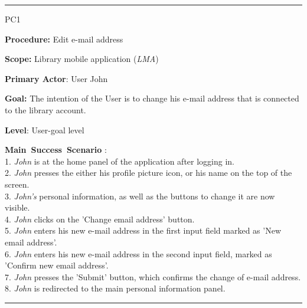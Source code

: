 \vspace{0.5cm}
\hrule
\begin{lyxlist}{PC1}
\small{
\item [\textbf{Procedure:}] Edit e-mail address
\item [\textbf{Scope:}] Library mobile application (\emph{LMA})
\item [\textbf{Primary Actor}:] User John
\item [\textbf{Goal:}] The intention of the User is to change his e-mail address
that is connected to the library account.
\item [\textbf{Level}:] User-goal level
\item [\textbf{Main~Success~Scenario}]:\\
1. \emph{John} is at the home panel of the application after logging in.\\
2. \emph{John} presses the either his profile picture icon, or his name on the
top of the screen.\\
3. \emph{John's} personal information, as well as the buttons to change it are
now visible.\\
4. \emph{John} clicks on the 'Change email address' button.\\
5. \emph{John} enters his new e-mail address in the first input field marked as
'New email address'. \\
6. \emph{John} enters his new e-mail address in the second input field, marked
as 'Confirm new email address'. \\
7. \emph{John} presses the 'Submit' button, which confirms the change of e-mail
address. \\
8. \emph{John} is redirected to the main personal information panel.\\

}

\end{lyxlist}
\hrule



